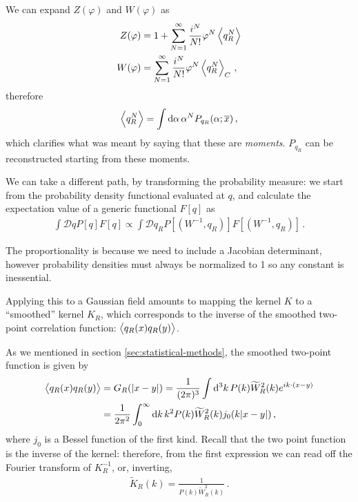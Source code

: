 \documentclass[main.tex]{subfiles}
\begin{document}
We can expand \(Z(\varphi )\) and \(W(\varphi )\) as 
%
\begin{align}
Z(\varphi ) &= 1 + \sum _{N=1}^{\infty } \frac{i^{N}}{N!} \varphi^{N} \expval{q_R^{N}} \\ 
W(\varphi ) &=  \sum _{N=1}^{\infty } \frac{i^{N}}{N!} \varphi^{N} \expval{q_R^{N}}_C  
\,,
\end{align}
%
therefore 
%
\begin{align}
\expval{q_R^{N}} = \int \dd{\alpha } \alpha^{N} P_{q_R} (\alpha ; \overline{x})
\,,
\end{align}
%
which clarifies what was meant by saying that these are \emph{moments}. 
\(P_{q_R}\) can be reconstructed starting from these moments. 


We can take a different path, by transforming the probability measure: we start from the probability density functional evaluated at \(q\), and calculate the expectation value of a generic functional \(F[q]\) as 
%
\begin{align}
\int \mathcal{D}q P[q] F[q]
\propto \int \mathcal{D}q_R P[(W^{-1}, q_R)] F[(W^{-1}, q_R)]
\,.
\end{align}

The proportionality is because we need to include a Jacobian determinant, however probability densities must always be normalized to 1 so any constant is inessential. 

Applying this to a Gaussian field amounts to mapping the kernel \(K\) to a ``smoothed'' kernel \(K_R\), which corresponds to the inverse of the smoothed two-point correlation function: \(\expval{q_R(x) q_R(y)}\). 


As we mentioned in section \ref{sec:statistical-methods}, the smoothed two-point function is given by 
% 
\begin{align}
\expval{q_R (x) q_R(y)} &= G_R ( \abs{x-y}) = \frac{1}{(2 \pi )^3}
\int \dd[3]{k} P(k) \widetilde{W}^2_R(k) e^{i k \cdot (x-y)}  \\
&= \frac{1}{2 \pi^2} \int_0^{\infty } \dd{k } k^2 P(k) \widetilde{W}^2_R (k) j_0 (k \abs{x-y})
\,,
\end{align}
%
where \(j_0 \) is a Bessel function of the first kind. 
Recall that the two point function is the inverse of the kernel: therefore, from the first expression we can read off the Fourier transform of \(K^{-1}_R\), or, inverting, 
%
\begin{align}
\widetilde{K}_R (k) = \frac{1}{P(k) \widetilde{W}_R^2(k)} 
\,.
\end{align}
\end{document}

